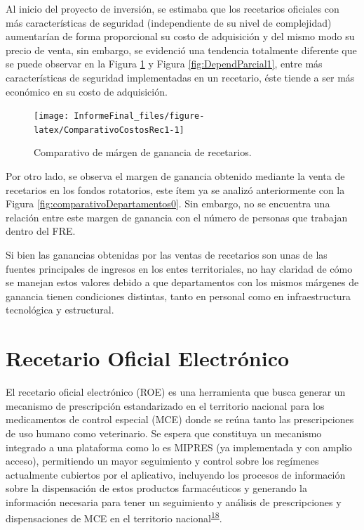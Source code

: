 \documentclass[
]{book}
\begin{document}
Al inicio del proyecto de inversión, se estimaba que los recetarios oficiales con más características de seguridad (independiente de su nivel de complejidad) aumentarían de forma proporcional su costo de adquisición y del mismo modo su precio de venta, sin embargo, se evidenció una tendencia totalmente diferente que se puede observar en la Figura \ref{fig:ComparativoCostosRec1} y Figura \ref{fig:DependParcial1}, entre más características de seguridad implementadas en un recetario, éste tiende a ser más económico en su costo de adquisición.

\begin{figure}

{\centering \texttt{[image: InformeFinal\_files/figure-latex/ComparativoCostosRec1-1]} 

}

\caption{Comparativo de márgen de ganancia de recetarios.}\label{fig:ComparativoCostosRec1}
\end{figure}

Por otro lado, se observa el margen de ganancia obtenido mediante la venta de recetarios en los fondos rotatorios, este ítem ya se analizó anteriormente con la Figura \ref{fig:comparativoDepartamentos0}. Sin embargo, no se encuentra una relación entre este margen de ganancia con el número de personas que trabajan dentro del FRE.

Si bien las ganancias obtenidas por las ventas de recetarios son unas de las fuentes principales de ingresos en los entes territoriales, no hay claridad de cómo se manejan estos valores debido a que departamentos con los mismos márgenes de ganancia tienen condiciones distintas, tanto en personal como en infraestructura tecnológica y estructural.

\hypertarget{recetario-oficial-electruxf3nico}{%
\section{Recetario Oficial Electrónico}\label{recetario-oficial-electruxf3nico}}

El recetario oficial electrónico (ROE) es una herramienta que busca generar un mecanismo de prescripción estandarizado en el territorio nacional para los medicamentos de control especial (MCE) donde se reúna tanto las prescripciones de uso humano como veterinario. Se espera que constituya un mecanismo integrado a una plataforma como lo es MIPRES (ya implementada y con amplio acceso), permitiendo un mayor seguimiento y control sobre los regímenes actualmente cubiertos por el aplicativo, incluyendo los procesos de información sobre la dispensación de estos productos farmacéuticos y generando la información necesaria para tener un seguimiento y análisis de prescripciones y dispensaciones de MCE en el territorio nacional\textsuperscript{\protect\hyperlink{ref-CuervoBustamante2021}{18}}.
\end{document}
